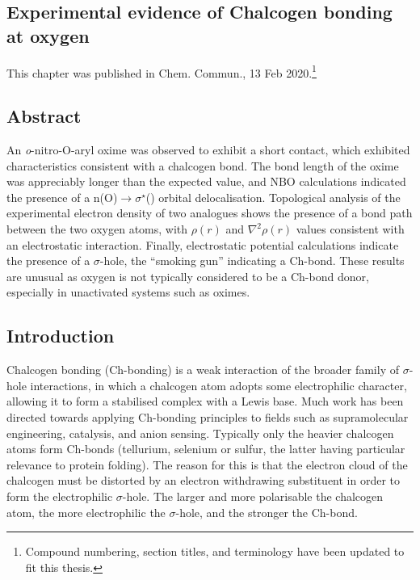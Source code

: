 \begin{refsection}

\chapter{Experimental evidence of Chalcogen bonding at oxygen}\label{sec:o-ch-bonding}

This chapter was published in Chem. Commun., 13 Feb 2020\autocite{Fellowes2020}.\footnote{Compound numbering, section titles, and terminology have been updated to fit this thesis.}

\section{Abstract}
An \emph{o}-nitro-O-aryl oxime was observed to exhibit a short  contact, which exhibited characteristics consistent with a chalcogen bond.
The  bond length of the oxime was appreciably longer than the expected value, and
NBO calculations indicated the presence of a n(O)$\rightarrow \sigma^{\star}$() orbital delocalisation.
Topological analysis of the experimental electron density of two analogues shows the presence of a bond path between the two oxygen atoms, with $\rho(r)$ and $\nabla^{2}\rho(r)$ values consistent with an electrostatic interaction.
Finally, electrostatic potential calculations indicate the presence of a $\sigma$-hole, the ``smoking gun'' indicating a Ch-bond.
These results are unusual as oxygen is not typically considered to be a Ch-bond donor, especially in unactivated systems such as oximes.

\section{Introduction}
Chalcogen bonding (Ch-bonding) is a weak interaction of the broader family of $\sigma$-hole interactions, in which a chalcogen atom adopts some electrophilic character, allowing it to form a stabilised complex with a Lewis base.
Much work has been directed towards applying Ch-bonding principles to fields such as supramolecular engineering, catalysis, and anion sensing.\autocite{Riwar2018,Mahmudov2017,Wonner2019,Ho2016,Kremer2016,Benz2017a}
Typically only the heavier chalcogen atoms form Ch-bonds (tellurium, selenium or sulfur, the latter having particular relevance to protein folding).\autocite{Iwaoka2012}
The reason for this is that the electron cloud of the chalcogen must be distorted by an electron withdrawing substituent in order to form the electrophilic $\sigma$-hole.
The larger and more polarisable the chalcogen atom, the more electrophilic the $\sigma$-hole, and the stronger the Ch-bond.\autocite{Murray2008}


\end{refsection}

